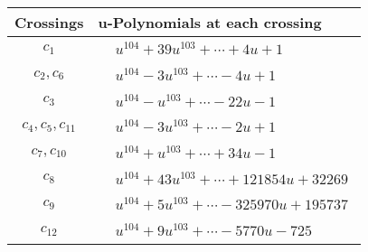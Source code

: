 \documentclass[1p]{elsarticle_modified}
\theoremstyle{definition}
\begin{document}
\begin{tabular}{m{50pt}|m{274pt}}
Crossings & \hspace{64pt}u-Polynomials at each crossing \\
\hline $$\begin{aligned}c_{1}\end{aligned}$$&$\begin{aligned}
&u^{104}+39 u^{103}+\cdots+4 u+1
\end{aligned}$\\
\hline $$\begin{aligned}c_{2},c_{6}\end{aligned}$$&$\begin{aligned}
&u^{104}-3 u^{103}+\cdots-4 u+1
\end{aligned}$\\
\hline $$\begin{aligned}c_{3}\end{aligned}$$&$\begin{aligned}
&u^{104}- u^{103}+\cdots-22 u-1
\end{aligned}$\\
\hline $$\begin{aligned}c_{4},c_{5},c_{11}\end{aligned}$$&$\begin{aligned}
&u^{104}-3 u^{103}+\cdots-2 u+1
\end{aligned}$\\
\hline $$\begin{aligned}c_{7},c_{10}\end{aligned}$$&$\begin{aligned}
&u^{104}+u^{103}+\cdots+34 u-1
\end{aligned}$\\
\hline $$\begin{aligned}c_{8}\end{aligned}$$&$\begin{aligned}
&u^{104}+43 u^{103}+\cdots+121854 u+32269
\end{aligned}$\\
\hline $$\begin{aligned}c_{9}\end{aligned}$$&$\begin{aligned}
&u^{104}+5 u^{103}+\cdots-325970 u+195737
\end{aligned}$\\
\hline $$\begin{aligned}c_{12}\end{aligned}$$&$\begin{aligned}
&u^{104}+9 u^{103}+\cdots-5770 u-725
\end{aligned}$\\
\hline
\end{tabular}\newpage\renewcommand{\arraystretch}{1}
\end{document}
